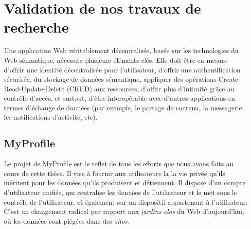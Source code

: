 \documentclass[a4paper]{article}
\begin{document}
\section{Validation de nos travaux de recherche}
\label{ch:implementations}
Une application Web véritablement décentralisée, basée sur les technologies du Web sémantique, nécessite plusieurs éléments clés. Elle doit être en mesure d'offrir une identité décentralisée pour l'utilisateur, d'offrir une authentification sécurisée, du stockage de données sémantique, appliquer des opérations Create-Read-Update-Delete (CRUD) aux ressources, d'offrir plus d'intimité grâce au contrôle d'accès, et surtout, d'être interopérable avec d'autres applications en termes d'échange de données (par exemple, le partage de contenu, la messagerie, les notifications d'activité, etc).

\subsection{MyProfile}
Le projet de MyProfile est le reflet de tous les efforts que nous avons faits au cours de cette thèse. Il vise à fournir aux utilisateurs la la vie privée qu'ils méritent pour les données qu'ils produisent et détiennent. Il dispose d'un compte d'utilisateur unifiée, qui centralise les données de l'utilisateur et le met sous le contrôle de l'utilisateur, et également sur un dispositif appartenant à l'utilisateur. C'est un changement radical par rapport aux \textit{jardins clos} du Web d'aujourd'hui, où les données sont piégées dans des \textit{silos}.\\
\end{document}
